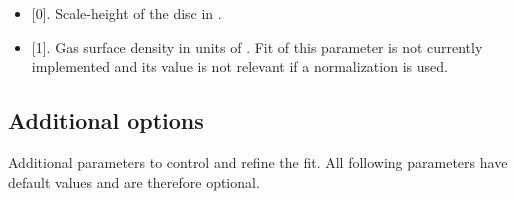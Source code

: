 \documentclass[letterpaper,10pt,english]{sphinxmanual}
\begin{document}
\begin{itemize}
\item {} 
 {[}0{]}. Scale-height of the disc in .

\item {} 
 {[}1{]}. Gas surface density in units of . Fit of this parameter is not currently implemented and its value is not relevant if a normalization is used.

\end{itemize}


\subsection{Additional options}
\label{\detokenize{tasks:additional-options}}\label{\detokenize{tasks:dfitopt}}
Additional parameters to control and refine the fit. All following parameters have default values and are therefore optional.
\end{document}
